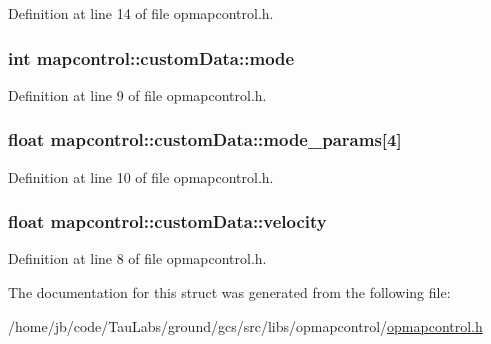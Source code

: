 \-Definition at line 14 of file opmapcontrol.\-h.

\hypertarget{structmapcontrol_1_1custom_data_a9279c0043a43ebef696356bae0099891}{
\subsubsection[{mode}]{\setlength{\rightskip}{0pt plus 5cm}int {\bf mapcontrol\-::custom\-Data\-::mode}}}\label{structmapcontrol_1_1custom_data_a9279c0043a43ebef696356bae0099891}


\-Definition at line 9 of file opmapcontrol.\-h.

\hypertarget{structmapcontrol_1_1custom_data_ad6156981de3b51dd4942a6c4a53dbc8d}{
\subsubsection[{mode\-\_\-params}]{\setlength{\rightskip}{0pt plus 5cm}float {\bf mapcontrol\-::custom\-Data\-::mode\-\_\-params}\mbox{[}4\mbox{]}}}\label{structmapcontrol_1_1custom_data_ad6156981de3b51dd4942a6c4a53dbc8d}


\-Definition at line 10 of file opmapcontrol.\-h.

\hypertarget{structmapcontrol_1_1custom_data_ab084fbb62527f0b71d74c9977c2e3f90}{
\subsubsection[{velocity}]{\setlength{\rightskip}{0pt plus 5cm}float {\bf mapcontrol\-::custom\-Data\-::velocity}}}\label{structmapcontrol_1_1custom_data_ab084fbb62527f0b71d74c9977c2e3f90}


\-Definition at line 8 of file opmapcontrol.\-h.



\-The documentation for this struct was generated from the following file\-:\begin{DoxyCompactItemize}
\item 
/home/jb/code/\-Tau\-Labs/ground/gcs/src/libs/opmapcontrol/\hyperlink{opmapcontrol_8h}{opmapcontrol.\-h}\end{DoxyCompactItemize}

